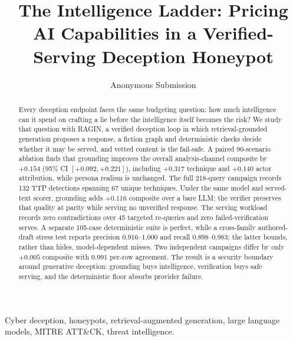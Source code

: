 \documentclass[conference,compsoc]{IEEEtran}
\newcommand{\attck}{ATT\&CK\xspace}
\begin{document}
\title{The Intelligence Ladder: Pricing AI Capabilities in a Verified-Serving Deception Honeypot}

\author{Anonymous Submission}

\maketitle

\begin{abstract}
Every deception endpoint faces the same budgeting question: how much
intelligence can it spend on crafting a lie before the intelligence itself
becomes the risk? We study that question with RAGIN, a verified deception
loop in which retrieval-grounded generation proposes a response, a fiction
graph and deterministic checks decide whether it may be served, and vetted
content is the fail-safe. A paired 90-scenario ablation finds that grounding
improves the overall analysis-channel composite by $+0.154$ (95\% CI
$[+0.092,+0.221]$), including $+0.317$ technique and $+0.140$ actor
attribution, while persona realism is unchanged. The full 218-query campaign
records 132 TTP detections spanning 67 unique techniques. Under the same
model and served-text scorer, grounding adds $+0.116$ composite over a bare
LLM; the verifier preserves that quality at parity while serving no
unverified response. The serving workload records zero contradictions over
45 targeted re-queries and zero failed-verification serves. A separate
105-case deterministic suite is perfect, while a cross-family authored-draft
stress test reports precision $0.916$--$1.000$ and recall $0.898$--$0.983$;
the latter bounds, rather than hides, model-dependent misses. Two independent
campaigns differ by only $+0.005$ composite with $0.991$ per-row agreement.
The result is a security boundary around generative deception: grounding buys
intelligence, verification buys safe serving, and the deterministic floor
absorbs provider failure.
\end{abstract}

\begin{IEEEkeywords}
Cyber deception, honeypots, retrieval-augmented generation, large language
models, MITRE \attck, threat intelligence.
\end{IEEEkeywords}














\end{document}
